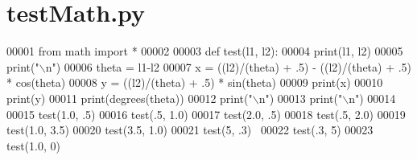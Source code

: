 \section{test\+Math.\+py}
\label{test_math_8py_source}

\begin{DoxyCode}
00001 \textcolor{keyword}{from} math \textcolor{keyword}{import} *
00002 
00003 \textcolor{keyword}{def }test(l1, l2):
00004     print(l1, l2)
00005     print(\textcolor{stringliteral}{"\(\backslash\)n"})
00006     theta = l1-l2
00007     x = ((l2)/(theta) + .5) - ((l2)/(theta) + .5) * cos(theta)
00008     y = ((l2)/(theta) + .5) * sin(theta)
00009     print(x)
00010     print(y)
00011     print(degrees(theta))
00012     print(\textcolor{stringliteral}{"\(\backslash\)n"})
00013     print(\textcolor{stringliteral}{"\(\backslash\)n"})
00014 
00015 test(1.0, .5)
00016 test(.5, 1.0)
00017 test(2.0, .5)
00018 test(.5, 2.0)
00019 test(1.0, 3.5)
00020 test(3.5, 1.0)
00021 test(5, .3) 
00022 test(.3, 5)
00023 test(1.0, 0)
\end{DoxyCode}
